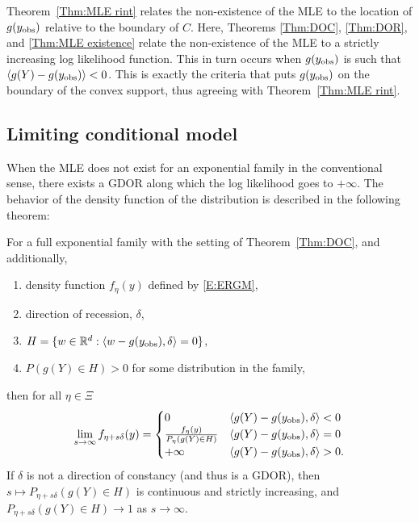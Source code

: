 Theorem~\ref{Thm:MLE rint} relates the non-existence of the MLE to the location
of $g(y_{\textrm{obs}})$ relative to the boundary of $C$.  Here, Theorems \ref{Thm:DOC}, \ref{Thm:DOR}, and \ref{Thm:MLE existence} relate the non-existence of the MLE
to a strictly increasing log likelihood function.  This in turn
occurs when $g(y_{\textrm{obs}})$ is such that $\langle g(Y) - g(y_{\textrm{obs}}) \rangle < 0$.  This is
exactly the criteria that puts $g(y_{\textrm{obs}})$ on the boundary of the convex support,
thus agreeing with Theorem~\ref{Thm:MLE rint}.



\subsection{Limiting conditional model}
When the MLE does not exist for an exponential family in the conventional sense, there 
exists a GDOR along which the log likelihood goes to $+\infty$.  The behavior of the 
density function of the distribution is described in the following theorem:

\begin{theorem} \label{Thm:LCM}
For a full exponential family with the setting of Theorem~\ref{Thm:DOC}, and 
additionally,
\begin{enumerate}
\item density function $f_{\eta}(y)$ defined by \eqref{E:ERGM},
\item direction of recession, $\delta$,
\item $H = \{ w \in {\mathbb R}^d: \langle  w-g(y_{\textrm{obs}}), \delta  \rangle = 0 \}$,
\item $P( g(Y) \in H) > 0$ for some distribution in the family,
\end{enumerate}
then for all $\eta \in \Xi$
\begin{align} \label{E:LCM}
\lim_{s \to \infty} f_{\eta+s\delta}(y) = 
			\begin{cases} 
			0 								& \langle g(Y) - g(y_{\textrm{obs}}), \delta \rangle < 0 \\
			\frac{f_\eta(y)}{P_\eta(g(Y) \in H)} 	& \langle g(Y) - g(y_{\textrm{obs}}),
\delta \rangle = 0 \\
			+\infty							& \langle g(Y) - g(y_{\textrm{obs}}), \delta \rangle > 0.
		\end{cases}
\end{align}
If $\delta$ is not a direction of constancy (and thus is a GDOR), 
then $s \mapsto P_{\eta+s\delta}( g(Y) \in H)$ is continuous and 
strictly increasing, and $P_{\eta+s\delta}( g(Y) \in H) \to 1$ as $s \to \infty$.
\end{theorem}


